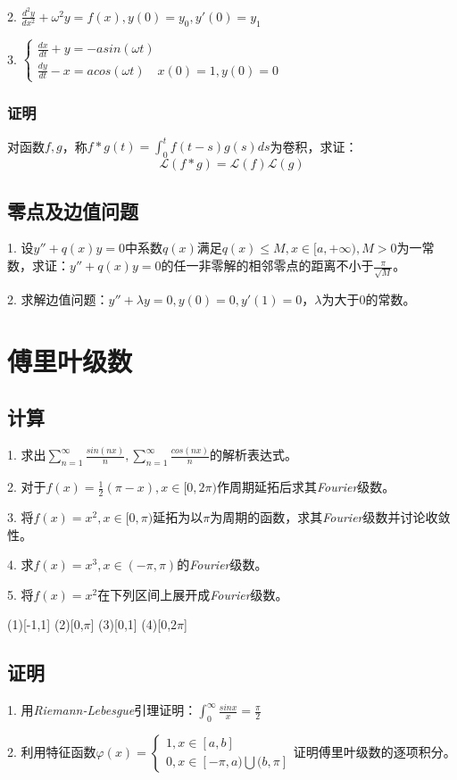 \documentclass[UTF8,a4paper,12pt]{ctexart}
\begin{document}
2. $\frac{d^2y}{dx^2}+\omega^2y=f(x), y(0)=y_0, y'(0)=y_1$

3. $\begin{cases}
\frac{dx}{dt}+y=-asin(\omega t)\\
\frac{dy}{dt}-x=acos(\omega t) \quad x(0)=1, y(0)=0
\end{cases}$

\subsubsection{证明}
对函数$f,g$，称$f*g(t)=\int_0^t f(t-s)g(s)ds$为卷积，求证：
$$\mathscr{L}(f*g)=\mathscr{L}(f)\mathscr{L}(g)$$

\subsection{零点及边值问题}
1. 设$y''+q(x)y=0$中系数$q(x)$满足$q(x)\leqslant M, x\in[a,+\infty), M>0$为一常数，求证：$y''+q(x)y=0$的任一非零解的相邻零点的距离不小于$\frac{\pi}{\sqrt{M}}$。

2. 求解边值问题：$y''+\lambda y=0, y(0)=0, y'(1)=0$，$\lambda$为大于0的常数。

\section{傅里叶级数}
\subsection{计算}
1. 求出$\sum\limits_{n=1}^\infty \frac{sin(nx)}{n}, \sum\limits_{n=1}^\infty \frac{cos(nx)}{n}$的解析表达式。

2. 对于$f(x)=\frac{1}{2}(\pi-x), x\in[0,2\pi)$作周期延拓后求其\emph{Fourier}级数。

3. 将$f(x)=x^2, x\in[0,\pi)$延拓为以$\pi$为周期的函数，求其\emph{Fourier}级数并讨论收敛性。

4. 求$f(x)=x^3, x\in(-\pi,\pi)$的\emph{Fourier}级数。

5. 将$f(x)=x^2$在下列区间上展开成\emph{Fourier}级数。

(1)[-1,1] \quad (2)[0,$\pi$] \quad (3)[0,1] \quad (4)[0,$2\pi$]

\subsection{证明}
1. 用\emph{Riemann-Lebesgue}引理证明：$\int_0^\infty \frac{sinx}{x}=\frac{\pi}{2}$

2. 利用特征函数$\varphi(x)=
\begin{cases}
1, x\in[a,b]\\
0, x\in[-\pi,a)\bigcup(b,\pi]
\end{cases}$证明傅里叶级数的逐项积分。
\end{document}
